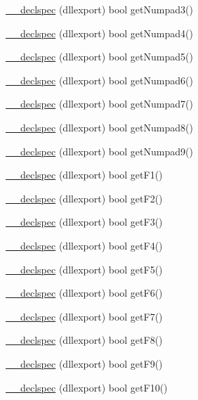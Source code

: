 \begin{DoxyCompactItemize}
\hyperlink{class_update_data_a704b0267b2b6ab370e3a61c9e8643f57}{\-\_\-\-\_\-declspec} (dllexport) bool get\-Numpad3()
\item 
\hyperlink{class_update_data_a8e94e99a2e7115ae6ff5b3469edfec54}{\-\_\-\-\_\-declspec} (dllexport) bool get\-Numpad4()
\item 
\hyperlink{class_update_data_af8fc9dcfd2ad6d7d853a87d5c8d12ce1}{\-\_\-\-\_\-declspec} (dllexport) bool get\-Numpad5()
\item 
\hyperlink{class_update_data_a90d1ed4ad85aba70baab759bcd10eea0}{\-\_\-\-\_\-declspec} (dllexport) bool get\-Numpad6()
\item 
\hyperlink{class_update_data_ab0519dd75ba585867b234ec60526dffb}{\-\_\-\-\_\-declspec} (dllexport) bool get\-Numpad7()
\item 
\hyperlink{class_update_data_a6ea123ebe66adb87bba2d618b9437048}{\-\_\-\-\_\-declspec} (dllexport) bool get\-Numpad8()
\item 
\hyperlink{class_update_data_a4ce011f6fbffa01fc647f3559f3f3824}{\-\_\-\-\_\-declspec} (dllexport) bool get\-Numpad9()
\item 
\hyperlink{class_update_data_a026066a9bc1e6f222657ba7d68f95ca4}{\-\_\-\-\_\-declspec} (dllexport) bool get\-F1()
\item 
\hyperlink{class_update_data_a87f1cab818bada610012feae4f348882}{\-\_\-\-\_\-declspec} (dllexport) bool get\-F2()
\item 
\hyperlink{class_update_data_acdb4d370dd72be1ab6a10cdeb3e54b8f}{\-\_\-\-\_\-declspec} (dllexport) bool get\-F3()
\item 
\hyperlink{class_update_data_a3820f10c15a24cb31292ac6e2c0fb53c}{\-\_\-\-\_\-declspec} (dllexport) bool get\-F4()
\item 
\hyperlink{class_update_data_a70ae387a5d7d83c66727b1814922fb9c}{\-\_\-\-\_\-declspec} (dllexport) bool get\-F5()
\item 
\hyperlink{class_update_data_a76b7ebbdcdb5b6a34167fcf533ace7ed}{\-\_\-\-\_\-declspec} (dllexport) bool get\-F6()
\item 
\hyperlink{class_update_data_a81742f10f06abd63f13783fa9bfcc2ed}{\-\_\-\-\_\-declspec} (dllexport) bool get\-F7()
\item 
\hyperlink{class_update_data_a2a24c5a92137a2a29275c34165c15028}{\-\_\-\-\_\-declspec} (dllexport) bool get\-F8()
\item 
\hyperlink{class_update_data_a2e26d7d7e65cdd1a40019f989a777972}{\-\_\-\-\_\-declspec} (dllexport) bool get\-F9()
\item 
\hyperlink{class_update_data_ab3199ce8e6c0994848782e1ca0e34ef8}{\-\_\-\-\_\-declspec} (dllexport) bool get\-F10()

\end{DoxyCompactItemize}
